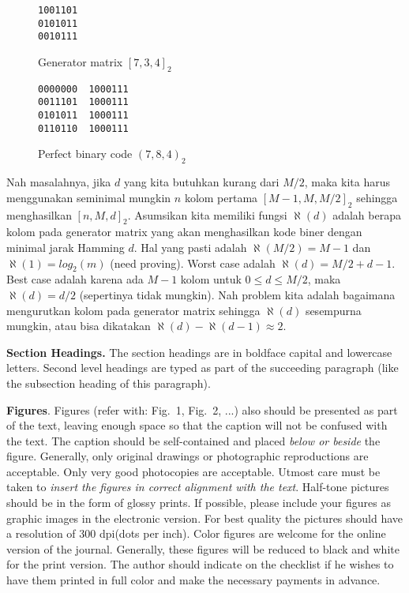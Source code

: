 \documentclass{TTP_DSL2006}
\begin{document}
\begin{figure}
\centering
\begin{BVerbatim}
1001101
0101011
0010111
\end{BVerbatim}
\caption{Generator matrix $[7,3,4]_2$}
\label{fig:generator734}
\end{figure}

\begin{figure}
\centering
\begin{BVerbatim}
0000000  1000111
0011101  1000111
0101011  1000111
0110110  1000111
\end{BVerbatim}
\caption{Perfect binary code $(7,8,4)_2$}
\label{fig:binarycode784}
\end{figure}

Nah masalahnya, jika $d$ yang kita butuhkan kurang dari $M/2$, maka kita harus menggunakan seminimal mungkin $n$ kolom pertama $[M-1,M,M/2]_2$ sehingga menghasilkan $[n,M,d]_2$. Asumsikan kita memiliki fungsi $\aleph(d)$ adalah berapa kolom pada generator matrix yang akan menghasilkan kode biner dengan minimal jarak Hamming $d$. Hal yang pasti adalah $\aleph(M/2) = M-1$ dan $\aleph(1) = {log}_2(m)$ (need proving). Worst case adalah $\aleph(d)=M/2 + d - 1$. Best case adalah karena ada $M-1$ kolom untuk $0 \leq d \leq M/2$, maka $\aleph(d) = d/2$ (sepertinya tidak mungkin). Nah problem kita adalah bagaimana mengurutkan kolom pada generator matrix sehingga $\aleph(d)$ sesempurna mungkin, atau bisa dikatakan $\aleph(d) - \aleph(d-1) \approx 2$.

\noindent \textbf{Section Headings.} The section headings are in boldface capital and lowercase letters. 
Second level headings are typed as part of the succeeding paragraph (like the subsection heading of this paragraph).

\textbf{Figures}. Figures (refer with: Fig.~1, Fig.~2, ...) also should be presented as part of the text, leaving enough space so that the 
caption will not be confused with the text. The caption should be self-contained and placed \textit{below or beside }the 
figure. Generally, only original drawings or photographic reproductions are acceptable. Only very good photocopies are 
acceptable. Utmost care must be taken to \textit{insert the figures in correct alignment with the text}. Half-tone pictures
 should be in the form of glossy prints. If possible, please include your figures as graphic images in the electronic version. 
For best quality the pictures should have a resolution of 300 dpi(dots per inch).
\noindent Color figures are welcome for the online version of the journal. Generally, these figures will be reduced to black 
and white for the print version. The author should indicate on the checklist if he wishes to have them printed in full color 
and make the necessary payments in advance.
\end{document}
